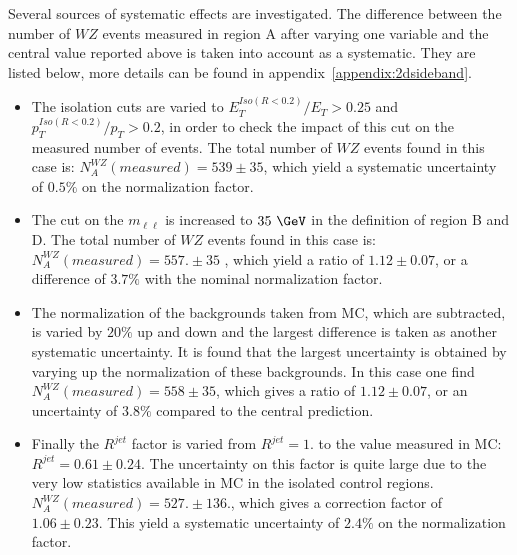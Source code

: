 Several sources of systematic effects are investigated. The difference between the number of $WZ$ events measured in region A after varying one variable and the central value reported above is taken into account as a systematic. They are listed below, more details can be found in appendix~\ref{appendix:2dsideband}.
\begin{itemize}
\item The isolation cuts are varied to $E_{T}^{Iso(R<0.2)}/E_{T}>0.25$ and $p_{T}^{Iso(R<0.2)}/p_{T}>0.2$, in order to check the impact of this cut on the measured number of events. The total number of $WZ$ events found in this case is: $N_A^{WZ}(measured)=539 \pm 35$, which yield a systematic uncertainty of $0.5\%$ on the normalization factor.

 
\item The cut on the $m_{\ell\ell}$ is increased to $35~\GeV$ in the definition of region B and D. The total number of $WZ$ events found in this case is: $N_A^{WZ}(measured)=557. \pm 35$ , which yield a ratio of $1.12 \pm 0.07$, or a difference of $3.7\%$ with the nominal normalization factor.

\item The normalization of the backgrounds taken from MC, which are subtracted, is varied by $20\%$ up and down and the largest difference is taken as another systematic uncertainty. It is found that the largest uncertainty is obtained by varying up the normalization of these backgrounds. In this case one find $N_A^{WZ}(measured)=558 \pm 35$, which gives a ratio of $1.12 \pm 0.07$, or an uncertainty of $3.8\%$ compared to the central prediction.

 
\item Finally the $R^{jet}$ factor is varied from $R^{jet} =1.$ to the value measured in MC: $R^{jet} =0.61 \pm 0.24$. The uncertainty on this factor is quite large due to the very low statistics available in MC in the isolated control regions. $N_A^{WZ}(measured)=527. \pm 136.$, which gives a correction factor of $1.06 \pm 0.23$. This yield a systematic uncertainty of $2.4\%$ on the normalization factor.

\end{itemize}

